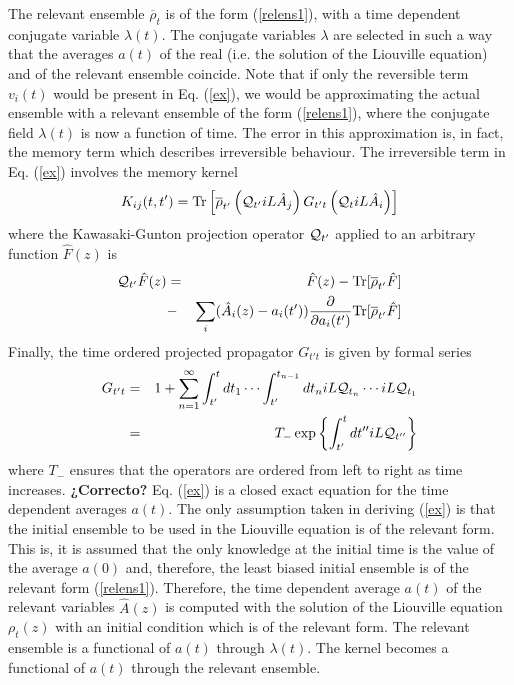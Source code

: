 \documentclass[b5paper,openright,11pt]{book}
\newcommand{\Note}[1]{{\bf \color{red}#1}}    %
\newcommand{\Pendiente}[1]{{\color{green}#1}} %
\begin{document}
The  relevant
ensemble $\overline{\rho}_t$  is of  the form (\ref{relens1}),  with a
time   dependent  conjugate   variable  $\lambda(t)$.   The  conjugate
variables  $\lambda$ are  selected in  such  a way  that the  averages
$a(t)$ of the  real (i.e. the  solution of the Liouville equation) and of the relevant ensemble  coincide.  Note that
if   only  the   reversible  term   $v_i(t)$  would   be  present   in
Eq. (\ref{ex}), we would be  approximating the actual ensemble 
with a relevant  ensemble of
the form (\ref{relens1}), where the conjugate field $\lambda(t)$ is now
a function of time.  The error  in this approximation is, in fact, the
memory term which describes  irreversible behaviour.  The irreversible
term in Eq. (\ref{ex}) involves the memory kernel
\begin{equation}
K_{ij}(t,t') =
{\rm Tr}\left[\overline{\rho}_{t'} 
\left({\cal Q}_{t'} iL\hat{A}_j\right) G_{t't}
\left({\cal Q}_{t } iL\hat{A}_i\right)\right]
\label{ker}
\end{equation}
where   the  Kawasaki-Gunton   projection  operator   ${\cal  Q}_{t'}$
\cite{Kawasaki1973a,  Grabert1982}  applied  to an  arbitrary  function
$\hat{F}(z)$ is
\begin{eqnarray}
{\cal Q}_{t'}\hat{F}(z)& = &\hat{F}(z)- {\rm Tr}[\overline{\rho}_{t'} \hat{F}]
\nonumber\\
&-&\sum_i(\hat{A}_i(z)-a_i(t'))\frac{\partial }{\partial a_i(t')}
{\rm Tr}[\overline{\rho}_{t'} \hat{F}]
\label{Q}
\end{eqnarray}
Finally, the time ordered projected propagator $G_{t't}$ is given by formal series
\begin{eqnarray}
G_{t't}&=&1
+\sum_{n=1}^\infty \int_{t'}^tdt_1\cdots\int_{t'}^{t_{n-1}}dt_n
 iL{\cal Q}_{t_n}\cdots  iL{\cal Q}_{t_1}
\nonumber\\
&=&T_-\exp\left\{\int_{t'}^t dt''  iL{\cal Q}_{t''}\right\}
\end{eqnarray}
\Pendiente{where $T_-$ ensures that the operators are ordered from left to right as time increases.} \Note{¿Correcto?}
Eq.   (\ref{ex}) is  a closed  exact equation  for the  time dependent
averages $a(t)$.  The only assumption  taken in deriving (\ref{ex}) is
that the initial  ensemble to be used in the  Liouville equation is of
the relevant form.  This is, it is assumed that  the only knowledge at
the initial  time is the value  of the average $a(0)$  and, therefore,
the  least   biased  initial   ensemble  is   of  the   relevant  form
(\ref{relens1}).  Therefore, the time  dependent average $a(t)$ of the
relevant variables $\hat{A}(z)$  is computed with the  solution of the
Liouville equation $\rho_t(z)$  with an initial condition  which is of
the relevant  form.  The relevant  ensemble is a functional  of $a(t)$
through  $\lambda(t)$.   The kernel  becomes  a  functional of  $a(t)$
through the relevant  ensemble.  
\end{document}
